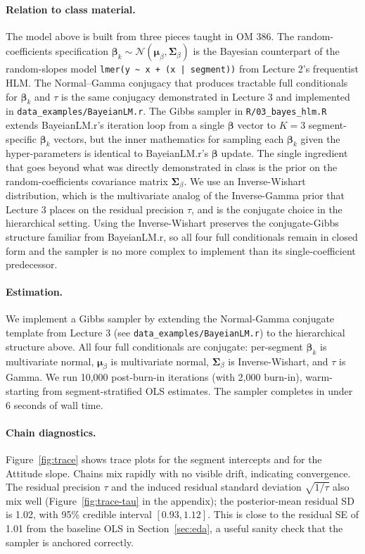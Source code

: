 \documentclass[11pt]{article}
\begin{document}
\paragraph{Relation to class material.} The model above is built
from three pieces taught in OM 386. The random-coefficients
specification $\boldsymbol{\beta}_k \sim \mathcal{N}(\boldsymbol{\mu}_\beta,
\boldsymbol{\Sigma}_\beta)$ is the Bayesian counterpart of the
random-slopes model
\texttt{lmer(y \textasciitilde{} x + (x | segment))} from Lecture 2's
frequentist HLM. The Normal--Gamma conjugacy that produces tractable
full conditionals for $\boldsymbol{\beta}_k$ and $\tau$ is the same
conjugacy demonstrated in Lecture 3 and implemented in
\texttt{data\_examples/BayeianLM.r}. The Gibbs sampler in
\texttt{R/03\_bayes\_hlm.R} extends BayeianLM.r's iteration loop
from a single $\boldsymbol{\beta}$ vector to $K = 3$
segment-specific $\boldsymbol{\beta}_k$ vectors, but the inner
mathematics for sampling each $\boldsymbol{\beta}_k$ given the
hyper-parameters is identical to BayeianLM.r's $\boldsymbol{\beta}$
update. The single ingredient that goes beyond what was directly
demonstrated in class is the prior on the random-coefficients
covariance matrix $\boldsymbol{\Sigma}_\beta$. We use an
Inverse-Wishart distribution, which is the multivariate analog of
the Inverse-Gamma prior that Lecture 3 places on the residual
precision $\tau$, and is the conjugate choice in the hierarchical
setting. Using the Inverse-Wishart preserves the conjugate-Gibbs
structure familiar from BayeianLM.r, so all four full conditionals
remain in closed form and the sampler is no more complex to
implement than its single-coefficient predecessor.

\paragraph{Estimation.} We implement a Gibbs sampler by extending the
Normal-Gamma conjugate template from Lecture 3 (see
\texttt{data\_examples/BayeianLM.r}) to the hierarchical structure
above. All four full conditionals are conjugate: per-segment
$\boldsymbol{\beta}_k$ is multivariate normal,
$\boldsymbol{\mu}_\beta$ is multivariate normal,
$\boldsymbol{\Sigma}_\beta$ is Inverse-Wishart, and $\tau$ is Gamma.
We run 10{,}000 post-burn-in iterations (with 2{,}000 burn-in), warm-
starting from segment-stratified OLS estimates. The sampler completes
in under 6 seconds of wall time.

\paragraph{Chain diagnostics.} Figure~\ref{fig:trace} shows trace
plots for the segment intercepts and for the Attitude slope. Chains
mix rapidly with no visible drift, indicating convergence. The
residual precision $\tau$ and the induced residual standard deviation
$\sqrt{1/\tau}$ also mix well (Figure~\ref{fig:trace-tau} in the
appendix); the posterior-mean residual SD is 1.02, with 95\%
credible interval $[0.93, 1.12]$. This is close to the residual SE
of 1.01 from the baseline OLS in Section~\ref{sec:eda}, a useful
sanity check that the sampler is anchored correctly.
\end{document}
